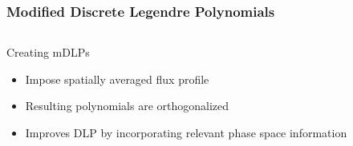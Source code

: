 \documentclass[fleqn]{beamer}
\begin{document}
  
  \begin{frame}
      \frametitle{Modified Discrete Legendre Polynomials}
      \begin{columns}[T]
          \begin{column}{0.4\textwidth}
              \begin{block}{Creating mDLPs}
                  \begin{itemize}
                      \item Impose spatially averaged flux profile
                      \item Resulting polynomials are orthogonalized
                      \item Improves DLP by incorporating relevant phase space 
                      information
                  \end{itemize}
              \end{block}
          \end{column}
          \begin{column}{0.6\textwidth}
              \centering
\end{column}
\end{columns}
\end{frame}
\end{document}
